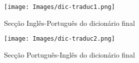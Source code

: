 \begin{figure}[H]
    \centering
    \centering
    \texttt{[image: Images/dic-traduc1.png]}
    \caption{Secção Inglês-Português do dicionário final}
    \label{fig:dic-traduc1}
\end{figure}

\begin{figure}[H]
    \centering
    \centering
    \texttt{[image: Images/dic-traduc2.png]}
    \caption{Secção Português-Inglês do dicionário final}
    \label{fig:dic-traduc2}
\end{figure}
